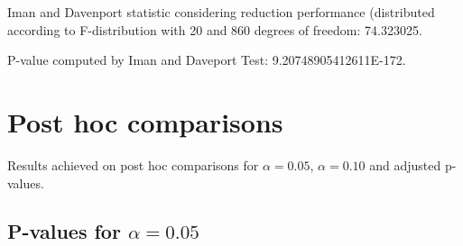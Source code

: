 \documentclass[a4paper,10pt]{article}
\begin{document}
\begin{landscape}
Iman and Davenport statistic considering reduction performance (distributed according to F-distribution with 20 and 860 degrees of freedom: 74.323025.

P-value computed by Iman and Daveport Test: 9.20748905412611E-172.\newline



\pagebreak

\section{Post hoc comparisons}

Results achieved on post hoc comparisons for $\alpha = 0.05$, $\alpha = 0.10$ and adjusted p-values.

\subsection{P-values for $\alpha=0.05$}


\end{landscape}
\end{document}
